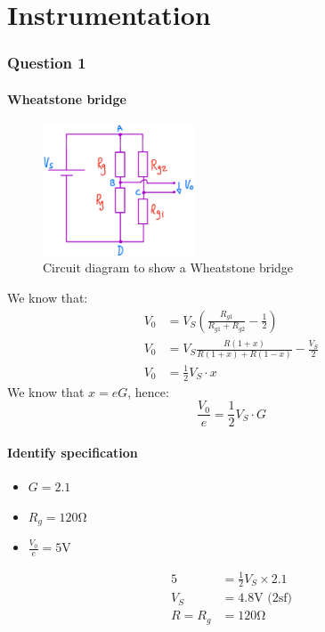 \documentclass[12pt]{article}
\numberwithin{equation}{section}
\begin{document}
\part{Instrumentation}
\section{Question 1}
\subsection*{Wheatstone bridge}
\begin{figure}[H]
  \centering
  \includegraphics[width=0.4\textwidth]{./img/4-1circuit.png}
  \caption{Circuit diagram to show a Wheatstone bridge}
\end{figure}
We know that:
\begin{align}
  V_0 &= V_S \left( \frac{R_{g1}}{R_{g1} + R_{g2}} - \frac{1}{2} \right)\\
  V_0 &= V_S \frac{R(1+x)}{R(1+x) + R(1-x)} - \frac{V_S}{2}\\
  V_0 &= \frac{1}{2} V_S \cdot x
\end{align}
We know that $x = eG$, hence:
\begin{equation}
  \frac{V_0}{e} = \frac{1}{2}V_S \cdot G
\end{equation}
\subsection*{Identify specification}
\begin{itemize}
  \item $G = 2.1$
  \item $R_g = 120\si{\ohm}$
  \item $\frac{V_0}{e} = 5\si{\volt}$
\end{itemize}
\begin{align}
  5 &= \frac{1}{2} V_S \times 2.1\\
  V_S &= 4.8 \si{\volt} \textrm{ (2sf)}\\
  R = R_g &= 120\si{\ohm}
\end{align}
\end{document}
